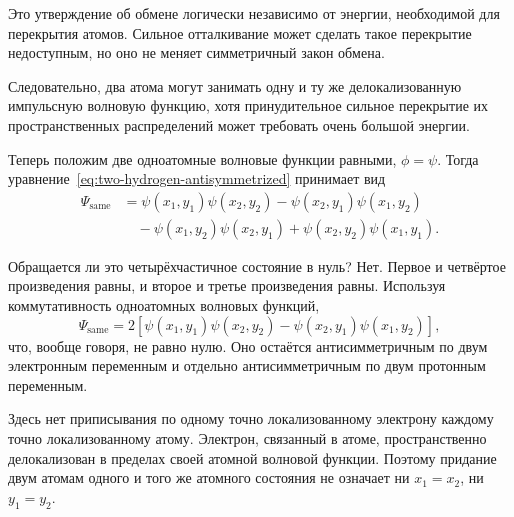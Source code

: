 Это утверждение об обмене логически независимо от энергии, необходимой для перекрытия атомов. Сильное отталкивание может сделать такое перекрытие недоступным, но оно не меняет симметричный закон обмена.

\begin{classroomqa}
\end{classroomqa}

Следовательно, два атома могут занимать одну и ту же делокализованную импульсную волновую функцию, хотя принудительное сильное перекрытие их пространственных распределений может требовать очень большой энергии.

Теперь положим две одноатомные волновые функции равными, \(\phi=\psi\). Тогда уравнение~\eqref{eq:two-hydrogen-antisymmetrized} принимает вид
\begin{align}
\Psi_{\mathrm{same}}
&=\psi(x_1,y_1)\psi(x_2,y_2)
-\psi(x_2,y_1)\psi(x_1,y_2)\nonumber\\
&\quad
-\psi(x_1,y_2)\psi(x_2,y_1)
+\psi(x_2,y_2)\psi(x_1,y_1).
\end{align}

Обращается ли это четырёхчастичное состояние в нуль? Нет. Первое и четвёртое произведения равны, и второе и третье произведения равны. Используя коммутативность одноатомных волновых функций,
\begin{equation}
\Psi_{\mathrm{same}}
=
2\left[
\psi(x_1,y_1)\psi(x_2,y_2)
-\psi(x_2,y_1)\psi(x_1,y_2)
\right],
\label{eq:same-hydrogen-state}
\end{equation}
что, вообще говоря, не равно нулю. Оно остаётся антисимметричным по двум электронным переменным и отдельно антисимметричным по двум протонным переменным.

Здесь нет приписывания по одному точно локализованному электрону каждому точно локализованному атому. Электрон, связанный в атоме, пространственно делокализован в пределах своей атомной волновой функции. Поэтому придание двум атомам одного и того же атомного состояния не означает ни \(x_1=x_2\), ни \(y_1=y_2\).

